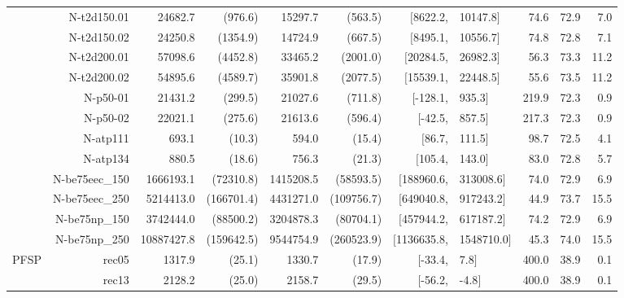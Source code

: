\documentclass[runningheads]{llncs}
\begin{document}
\begin{table}[tb]
{\begin{tabular}{r@{\hskip -2ex}*{5}{r}rl@{\hskip -2ex}*{3}{r}}
     & N-t2d150.01      & 24682.7                 & (976.6)    & 15297.7   & (563.5)                & $[$8622.2,    & 10147.8$]$    & 74.6 & 72.9 & 7.0  \\
     & N-t2d150.02      & 24250.8                 & (1354.9)   & 14724.9   & (667.5)                & $[$8495.1,    & 10556.7$]$    & 74.8 & 72.8 & 7.1  \\
     & N-t2d200.01      & 57098.6                 & (4452.8)   & 33465.2   & (2001.0)               & $[$20284.5,   & 26982.3$]$    & 56.3 & 73.3 & 11.2 \\
     & N-t2d200.02      & 54895.6                 & (4589.7)   & 35901.8   & (2077.5)               & $[$15539.1,   & 22448.5$]$    & 55.6 & 73.5 & 11.2 \\
     & N-p50-01         & 21431.2                 & (299.5)    & 21027.6   & (711.8)                & $[$-128.1,    & 935.3$]$      & 219.9& 72.3 & 0.9  \\
     & N-p50-02         & 22021.1                 & (275.6)    & 21613.6   & (596.4)                & $[$-42.5,     & 857.5$]$      & 217.3& 72.3 & 0.9  \\
     & N-atp111         & 693.1                   & (10.3)     & 594.0     & (15.4)                 & $[$86.7,      & 111.5$]$      & 98.7 & 72.5 & 4.1  \\
     & N-atp134         & 880.5                   & (18.6)     & 756.3     & (21.3)                 & $[$105.4,     & 143.0$]$      & 83.0 & 72.8 & 5.7  \\
     & N-be75eec\_150   & 1666193.1               & (72310.8)  & 1415208.5 & (58593.5)              & $[$188960.6,  & 313008.6$]$   & 74.0 & 72.9 & 6.9  \\
     & N-be75eec\_250   & 5214413.0               & (166701.4) & 4431271.0 & (109756.7)             & $[$649040.8,  & 917243.2$]$   & 44.9 & 73.7 & 15.5 \\
     & N-be75np\_150    & 3742444.0               & (88500.2)  & 3204878.3 & (80704.1)              & $[$457944.2,  & 617187.2$]$   & 74.2 & 72.9 & 6.9  \\
     & N-be75np\_250    & 10887427.8              & (159642.5) & 9544754.9 & (260523.9)             & $[$1136635.8, & 1548710.0$]$  & 45.3 & 74.0 & 15.5 \\\midrule
   PFSP     & rec05        & 1317.9                  & (25.1)     & 1330.7    & (17.9)                 & $[$-33.4,     & 7.8$]$        & 400.0& 38.9 & 0.1  \\
       & rec13        & 2128.2                  & (25.0)     & 2158.7    & (29.5)                 & $[$-56.2,     & -4.8$]$       & 400.0& 38.9 & 0.1  \\

\end{tabular}}
\end{table}
\end{document}
